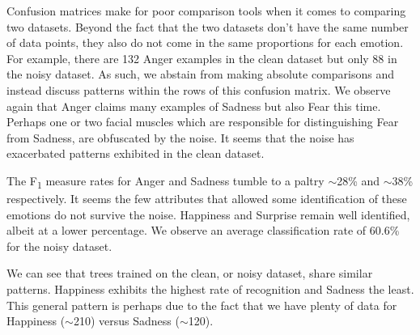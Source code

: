  

\newpage
Confusion matrices make for poor comparison tools when it comes to comparing two datasets.
Beyond the fact that the two datasets don't have the same number of data points,
they also do not come in the same proportions for each emotion. For example, there are 132 Anger examples in the clean dataset but only
88 in the noisy dataset. As such, we abstain from making absolute comparisons and instead discuss patterns within the rows
of this confusion matrix. We observe again that Anger claims many examples of Sadness but also Fear this time. Perhaps one or two facial
muscles which are responsible for distinguishing Fear from Sadness, are obfuscated by the noise.
It seems that the noise has exacerbated patterns exhibited in the clean dataset.



The F\textsubscript{1} measure rates for Anger and Sadness tumble to a paltry $\sim$28\% and $\sim$38\% respectively.
It seems the few attributes that allowed some identification of these emotions do not survive the noise.
Happiness and Surprise remain well identified, albeit at a lower percentage.
We observe an average classification rate of 60.6\% for the noisy dataset.


We can see that trees trained on the clean, or noisy dataset, share similar patterns.
Happiness exhibits the highest rate of recognition and Sadness the least.
This general pattern is perhaps due to the fact that we have plenty of data for Happiness ($\sim$210) versus Sadness ($\sim$120).



